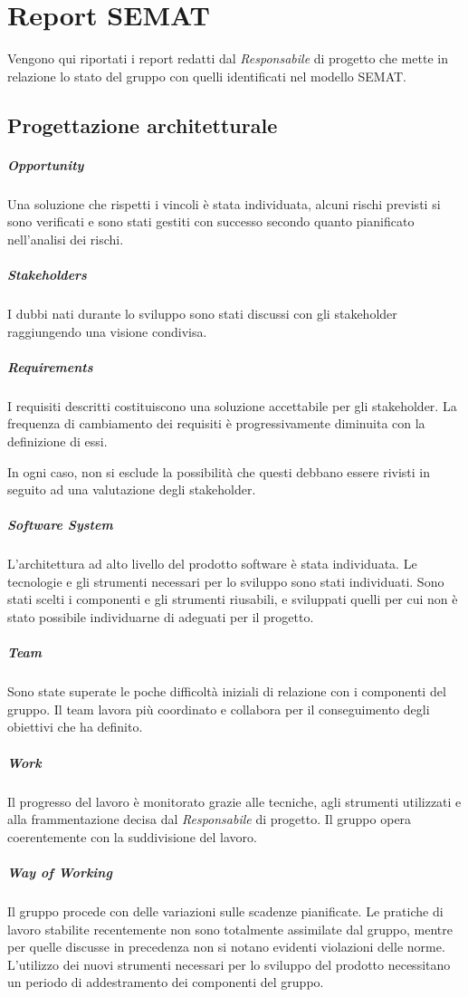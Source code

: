 \section{Report SEMAT}
Vengono qui riportati i report redatti dal \textit{Responsabile} di progetto che mette in relazione lo stato del gruppo con quelli identificati nel modello SEMAT.

\subsection{Progettazione architetturale}

	\subparagraph{Opportunity}
	Una soluzione che rispetti i vincoli è stata individuata, alcuni rischi previsti si sono verificati e sono stati gestiti con successo secondo quanto pianificato nell'analisi dei rischi.

	\subparagraph{Stakeholders}
	I dubbi nati durante lo sviluppo sono stati discussi con gli stakeholder raggiungendo una visione condivisa.

	\subparagraph{Requirements}
	I requisiti descritti costituiscono una soluzione accettabile per gli stakeholder. La frequenza di cambiamento dei requisiti è progressivamente diminuita con la definizione di essi.

	In ogni caso, non si esclude la possibilità che questi debbano essere rivisti in seguito ad una valutazione degli stakeholder.

	\subparagraph{Software System}
	L'architettura ad alto livello del prodotto software è stata individuata. Le tecnologie e gli strumenti necessari per lo sviluppo sono stati individuati. Sono stati scelti i componenti e gli strumenti riusabili, e sviluppati quelli per cui non è stato possibile individuarne di adeguati per il progetto.

	\subparagraph{Team}
	Sono state superate le poche difficoltà iniziali di relazione con i componenti del gruppo. Il team lavora più coordinato e collabora per il conseguimento degli obiettivi che ha definito.

	\subparagraph{Work}
	Il progresso del lavoro è monitorato grazie alle tecniche, agli strumenti utilizzati e alla frammentazione decisa dal \textit{Responsabile} di progetto. Il gruppo opera coerentemente con la suddivisione del lavoro.

	\subparagraph{Way of Working}
	Il gruppo procede con delle variazioni sulle scadenze pianificate. Le pratiche di lavoro stabilite recentemente non sono totalmente assimilate dal gruppo, mentre per quelle discusse in precedenza non si notano evidenti violazioni delle norme. L'utilizzo dei nuovi strumenti necessari per lo sviluppo del prodotto necessitano un periodo di addestramento dei componenti del gruppo.